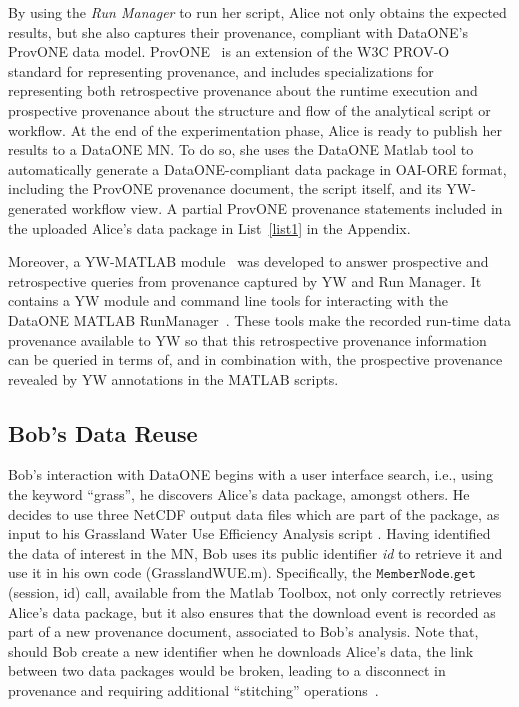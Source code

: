 \documentclass[a4paper]{llncs}
\newcommand{\mytt}[1]{\ensuremath{\mathtt{#1}}}
\newcommand{\authornote}[2] {
    \begin{center}
        \framebox{
            {\begin{minipage}[t]{0.9\linewidth}
                \color{red}
                \raggedright  \textbf{[#1]}~ \scriptsize #2 \normalsize
            \end{minipage}}
    }
    \end{center}
}
\begin{document}
By using the \emph{Run Manager} to run her script, Alice not only obtains the expected results, but she also captures their provenance, compliant with DataONE's ProvONE data model. 
ProvONE~\cite{provone} is an extension of the W3C PROV-O~\cite{prov-o} standard for representing provenance, and includes specializations for representing both retrospective provenance about the runtime execution and prospective provenance about the structure and flow of the analytical script or workflow.
%
At the end of the experimentation phase, Alice is ready to publish her results to a DataONE MN. 
To do so, she uses the  DataONE Matlab tool to automatically generate a DataONE-compliant data package in OAI-ORE format, including the ProvONE provenance document, the script itself, and its YW-generated workflow view. A partial ProvONE provenance statements included in the uploaded Alice's data package in List~\ref{list1} in the Appendix.


Moreover, a YW-MATLAB module~\cite{yw-matlab} was developed to answer prospective and retrospective queries from provenance captured by YW and Run Manager. It contains a YW module and command line tools for interacting with the DataONE MATLAB RunManager~\cite{matlabdataone}. These tools make the recorded run-time data provenance available to YW so that this retrospective provenance information can be queried in terms of, and in combination with, the prospective provenance revealed by YW annotations in the MATLAB scripts.


\subsection{Bob's Data Reuse}

Bob's interaction with DataONE begins with a user interface search, i.e., using the keyword ``grass'', he discovers Alice's data package, amongst others. 
He decides to use three NetCDF output data files which are part of the package, as input to his Grassland Water Use Efficiency Analysis script . 
Having identified the data of interest in the MN, Bob uses its public identifier \textit{id} to retrieve it and use it in his own code (GrasslandWUE.m).
Specifically, the \mytt{MemberNode.get}(session, id)  call, available from the Matlab Toolbox, not only correctly retrieves Alice's data package, but it also ensures that the download event is recorded as part of a new provenance document, associated to Bob's analysis.
%
Note that, should Bob create a new identifier when he downloads Alice's data, the link between two data packages would be broken, leading to a disconnect in provenance and requiring additional ``stitching'' operations~\cite{missing-link}.  
\end{document}

